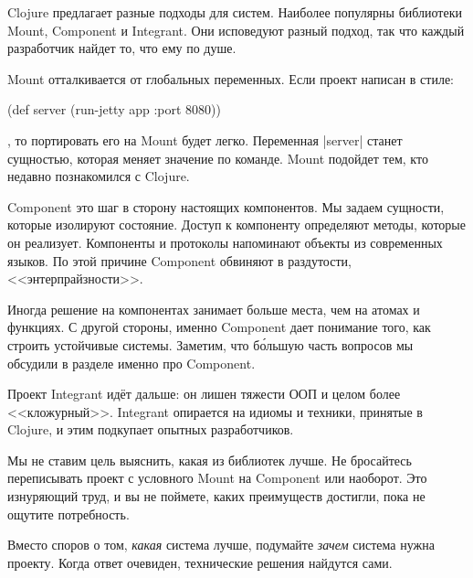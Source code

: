 Clojure предлагает разные подходы для систем. Наиболее популярны библиотеки
Mount, Component и Integrant. Они исповедуют разный подход, так что каждый
разработчик найдет то, что ему по душе.

Mount отталкивается от глобальных переменных. Если проект написан в стиле:

\begin{english}
  \begin{clojure}
(def server (run-jetty app {:port 8080}))
  \end{clojure}
\end{english}

\noindent
, то портировать его на Mount будет легко. Переменная \spverb|server| станет
сущностью, которая меняет значение по команде. Mount подойдет тем, кто недавно
познакомился с Clojure.

Component это шаг в сторону настоящих компонентов. Мы задаем сущности, которые
изолируют состояние. Доступ к компоненту определяют методы, которые он
реализует. Компоненты и протоколы напоминают объекты из современных языков. По
этой причине Component обвиняют в раздутости, <<энтерпрайзности>>.

Иногда решение на компонентах занимает больше места, чем на атомах и функциях. С
другой стороны, именно Component дает понимание того, как строить устойчивые
системы. Заметим, что б\'{о}льшую часть вопросов мы обсудили в разделе именно
про Component.

Проект Integrant ид\"{е}т дальше: он лишен тяжести ООП и целом более
<<кложурный>>. Integrant опирается на идиомы и техники, принятые в Clojure, и
этим подкупает опытных разработчиков.

Мы не ставим цель выяснить, какая из библиотек лучше. Не бросайтесь переписывать
проект с условного Mount на Component или наоборот. Это изнуряющий труд, и вы не
поймете, каких преимуществ достигли, пока не ощутите потребность.

Вместо споров о том, \emph{какая} система лучше, подумайте \emph{зачем} система
нужна проекту. Когда ответ очевиден, технические решения найдутся сами.
